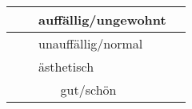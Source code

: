 \begin{longtable}{|l|l|l|l|l|l|}
     & \textbf{}          & \multicolumn{3}{l|}{auffällig/ungewohnt}                                 &                                                                                                                                                                                                                                                                                                                                                                                                                                                                                                                                                                                                                                                                                                         \\ \hline
     & \textbf{}          & \multicolumn{3}{l|}{unauffällig/normal}                                  &                                                                                                                                                                                                                                                                                                                                                                                                                                                                                                                                                                                                                                                                                                         \\ \hline
     & \textbf{}          & \multicolumn{3}{l|}{ästhetisch}                                          &                                                                                                                                                                                                                                                                                                                                                                                                                                                                                                                                                                                                                                                                                                         \\ \hline
     & \textbf{}          &            & \multicolumn{2}{l|}{gut/schön}                              &                                                                                                                                                                                                                                                                                                                                                                                                                                                                                                                                                                                                                                                                                                         \\ \hline

\end{longtable}
